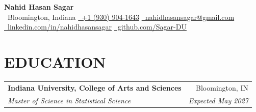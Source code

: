 \documentclass[10pt,letterpaper]{article}
\makeatletter
\newcommand{\resumeEntry}[4]{%
  \begin{tabularx}{\textwidth}{@{}Xr@{}}
    \textbf{#1} & #2 \\
    \textit{#3} & \textit{#4}
  \end{tabularx}%
}
\newcommand{\contactsep}{\qquad}
\makeatother
\begin{document}
\normalsize

\begin{center}
  {\LARGE
   \textbf{Nahid Hasan Sagar}}\\[2.2pt]

  {\footnotesize
    \faMapMarker*\, Bloomington, Indiana
    \contactsep
    \href{tel:+19309041643}{\faPhone*\, +1 (930) 904-1643}
    \contactsep
    \href{mailto:nahidhasansagar@gmail.com}{\faEnvelope\, nahidhasansagar@gmail.com}
  }\\[-0.2pt]

  {\footnotesize
    \href{https://www.linkedin.com/in/nahidhasansagar/}{\faLinkedinIn\, linkedin.com/in/nahidhasansagar}
    \contactsep
    \href{https://github.com/Sagar-DU}{\faGithub\, github.com/Sagar-DU}
  }
\end{center}

\vspace{-5pt}



\section*{EDUCATION}

\resumeEntry
  {Indiana University, College of Arts and Sciences}
  {Bloomington, IN}
  {Master of Science in Statistical Science}
  {Expected May 2027}

\vspace{0.4pt}
\end{document}
